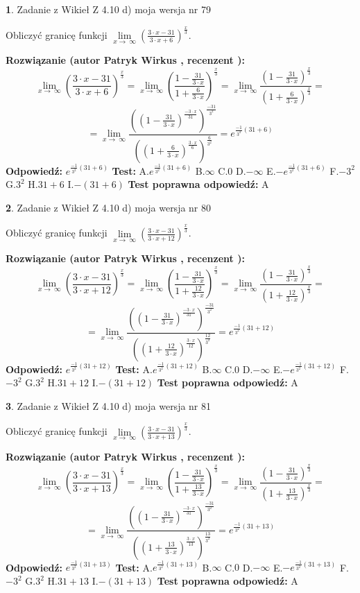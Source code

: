 \documentclass[12pt, a4paper]{article}
\theoremstyle{definition} %
\newtheorem{zad}{}
\newcommand{\zadStart}[1]{\begin{zad}#1\newline}
\newcommand{\zadStop}{\end{zad}}
\newcommand{\rozwStart}[2]{\noindent \textbf{Rozwiązanie (autor #1 , recenzent #2): }\newline}
\newcommand{\rozwStop}{\newline}
\newcommand{\odpStart}{\noindent \textbf{Odpowiedź:}\newline}
\newcommand{\odpStop}{\newline}
\newcommand{\testStart}{\noindent \textbf{Test:}\newline}
\newcommand{\testStop}{\newline}
\newcommand{\kluczStart}{\noindent \textbf{Test poprawna odpowiedź:}\newline}
\newcommand{\kluczStop}{\newline}
\begin{document}
\zadStart{Zadanie z Wikieł Z 4.10 d) moja wersja nr 79}


Obliczyć granicę funkcji  $\lim\limits_{x\to\ \infty}(\frac{3\cdot x-31}{3\cdot x+6})^{\frac{x}{3}}$.
\zadStop
\rozwStart{Patryk Wirkus}{}
$$\lim\limits_{x\to\ \infty}(\frac{3\cdot x-31}{3\cdot x+6})^{\frac{x}{3}} = \lim\limits_{x\to\ \infty}(\frac{1-\frac{31}{3\cdot x}}{1+\frac{6}{3\cdot x}})^{\frac{x}{3}}=\lim\limits_{x\to\ \infty}\frac{(1-\frac{31}{3\cdot x})^{\frac{x}{3}}}{(1+\frac{6}{3\cdot x})^{\frac{x}{3}}}=$$
$$=\lim\limits_{x\to\ \infty}\frac{((1-\frac{31}{3\cdot x})^{\frac{-3\cdot x}{31}})^{\frac{-31}{3^{2}}}}{((1+\frac{6}{3\cdot x})^{\frac{3\cdot x}{6}})^{\frac{6}{3^{2}}}}=e^{\frac{-1}{3^{2}}(31+6)}$$
\rozwStop
\odpStart
$e^{\frac{-1}{3^{2}}(31+6)}$
\odpStop
\testStart
A.$e^{\frac{-1}{3^{2}}(31+6)}$ B.$\infty$ C.$0$ D.$-\infty$ E.$-e^{\frac{-1}{3^{2}}(31+6)}$
F.$-3^{2}$ G.$3^{2}$
H.$31+6$
I.$-(31+6)$
\testStop
\kluczStart
A
\kluczStop



\zadStart{Zadanie z Wikieł Z 4.10 d) moja wersja nr 80}


Obliczyć granicę funkcji  $\lim\limits_{x\to\ \infty}(\frac{3\cdot x-31}{3\cdot x+12})^{\frac{x}{3}}$.
\zadStop
\rozwStart{Patryk Wirkus}{}
$$\lim\limits_{x\to\ \infty}(\frac{3\cdot x-31}{3\cdot x+12})^{\frac{x}{3}} = \lim\limits_{x\to\ \infty}(\frac{1-\frac{31}{3\cdot x}}{1+\frac{12}{3\cdot x}})^{\frac{x}{3}}=\lim\limits_{x\to\ \infty}\frac{(1-\frac{31}{3\cdot x})^{\frac{x}{3}}}{(1+\frac{12}{3\cdot x})^{\frac{x}{3}}}=$$
$$=\lim\limits_{x\to\ \infty}\frac{((1-\frac{31}{3\cdot x})^{\frac{-3\cdot x}{31}})^{\frac{-31}{3^{2}}}}{((1+\frac{12}{3\cdot x})^{\frac{3\cdot x}{12}})^{\frac{12}{3^{2}}}}=e^{\frac{-1}{3^{2}}(31+12)}$$
\rozwStop
\odpStart
$e^{\frac{-1}{3^{2}}(31+12)}$
\odpStop
\testStart
A.$e^{\frac{-1}{3^{2}}(31+12)}$ B.$\infty$ C.$0$ D.$-\infty$ E.$-e^{\frac{-1}{3^{2}}(31+12)}$
F.$-3^{2}$ G.$3^{2}$
H.$31+12$
I.$-(31+12)$
\testStop
\kluczStart
A
\kluczStop



\zadStart{Zadanie z Wikieł Z 4.10 d) moja wersja nr 81}


Obliczyć granicę funkcji  $\lim\limits_{x\to\ \infty}(\frac{3\cdot x-31}{3\cdot x+13})^{\frac{x}{3}}$.
\zadStop
\rozwStart{Patryk Wirkus}{}
$$\lim\limits_{x\to\ \infty}(\frac{3\cdot x-31}{3\cdot x+13})^{\frac{x}{3}} = \lim\limits_{x\to\ \infty}(\frac{1-\frac{31}{3\cdot x}}{1+\frac{13}{3\cdot x}})^{\frac{x}{3}}=\lim\limits_{x\to\ \infty}\frac{(1-\frac{31}{3\cdot x})^{\frac{x}{3}}}{(1+\frac{13}{3\cdot x})^{\frac{x}{3}}}=$$
$$=\lim\limits_{x\to\ \infty}\frac{((1-\frac{31}{3\cdot x})^{\frac{-3\cdot x}{31}})^{\frac{-31}{3^{2}}}}{((1+\frac{13}{3\cdot x})^{\frac{3\cdot x}{13}})^{\frac{13}{3^{2}}}}=e^{\frac{-1}{3^{2}}(31+13)}$$
\rozwStop
\odpStart
$e^{\frac{-1}{3^{2}}(31+13)}$
\odpStop
\testStart
A.$e^{\frac{-1}{3^{2}}(31+13)}$ B.$\infty$ C.$0$ D.$-\infty$ E.$-e^{\frac{-1}{3^{2}}(31+13)}$
F.$-3^{2}$ G.$3^{2}$
H.$31+13$
I.$-(31+13)$
\testStop
\kluczStart
A
\kluczStop
\end{document}
